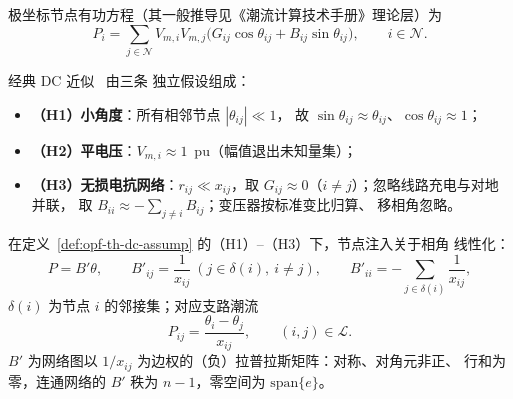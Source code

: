 极坐标节点有功方程（其一般推导见《潮流计算技术手册》理论层）为
\begin{equation}
P_i=\sum_{j\in\mathcal N}V_{m,i}V_{m,j}
\bigl(G_{ij}\cos\theta_{ij}+B_{ij}\sin\theta_{ij}\bigr),
\qquad i\in\mathcal N .
\label{eq:opf-th-dc-polar}
\end{equation}

\begin{definition}[DC 潮流假设]\label{def:opf-th-dc-assump}
经典 DC 近似~\cite{opfdc:stott-dc-revisited,opfdc:wood-wollenberg} 由三条
独立假设组成：
\begin{itemize}
  \item \textbf{（H1）小角度}：所有相邻节点 $|\theta_{ij}|\ll1$，
        故 $\sin\theta_{ij}\approx\theta_{ij}$、$\cos\theta_{ij}\approx1$；
  \item \textbf{（H2）平电压}：$V_{m,i}\approx1$~pu（幅值退出未知量集）；
  \item \textbf{（H3）无损电抗网络}：$r_{ij}\ll x_{ij}$，取
        $G_{ij}\approx0$（$i\neq j$）；忽略线路充电与对地并联，
        取 $B_{ii}\approx-\sum_{j\neq i}B_{ij}$；变压器按标准变比归算、
        移相角忽略。
\end{itemize}
\end{definition}

\begin{theorem}[DC 潮流方程]\label{thm:opf-th-dc-btheta}
在定义~\ref{def:opf-th-dc-assump} 的（H1）--（H3）下，节点注入关于相角
线性化：
\begin{equation}
P=B'\theta,\qquad
B'_{ij}=\frac{1}{x_{ij}}\ (j\in\delta(i),\ i\neq j),\qquad
B'_{ii}=-\sum_{j\in\delta(i)}\frac{1}{x_{ij}},
\label{eq:opf-th-dc-btheta}
\end{equation}
$\delta(i)$ 为节点 $i$ 的邻接集；对应支路潮流
\begin{equation}
P_{ij}=\frac{\theta_i-\theta_j}{x_{ij}},\qquad (i,j)\in\mathcal L .
\label{eq:opf-th-dc-branch}
\end{equation}
$B'$ 为网络图以 $1/x_{ij}$ 为边权的（负）拉普拉斯矩阵：对称、对角元非正、
行和为零，连通网络的 $B'$ 秩为 $n-1$，零空间为 $\mathrm{span}\{e\}$。
\end{theorem}

